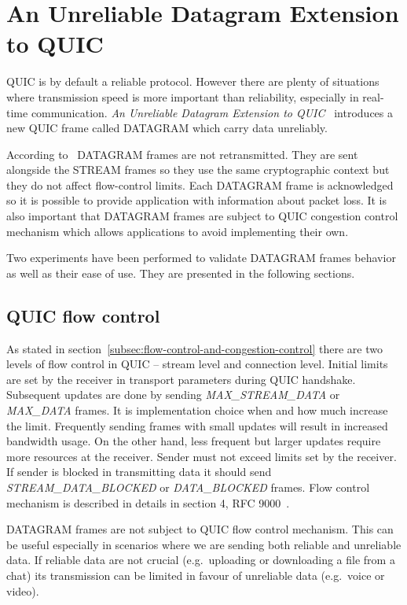 \section{An Unreliable Datagram Extension to QUIC}
\label{sec:datagrams}
QUIC is by default a reliable protocol.
However there are plenty of situations where transmission speed is more important than reliability, especially in real-time communication.
\textit{An Unreliable Datagram Extension to QUIC}~\cite{ietf-quic-datagram-02} introduces a new QUIC frame called DATAGRAM which carry data unreliably.

According to~\cite{ietf-quic-datagram-02} DATAGRAM frames are not retransmitted.
They are sent alongside the STREAM frames so they use the same cryptographic context but they do not affect flow-control limits.
Each DATAGRAM frame is acknowledged so it is possible to provide application with information about packet loss.
It is also important that DATAGRAM frames are subject to QUIC congestion control mechanism which allows applications to avoid implementing their own.

Two experiments have been performed to validate DATAGRAM frames behavior as well as their ease of use.
They are presented in the following sections.

\subsection{QUIC flow control}
\label{subsec:quic-flow-control}
As stated in section~\ref{subsec:flow-control-and-congestion-control} there are two levels of flow control in QUIC -- stream level and connection level.
Initial limits are set by the receiver in transport parameters during QUIC handshake.
Subsequent updates are done by sending \textit{MAX\_STREAM\_DATA} or \textit{MAX\_DATA} frames.
It is implementation choice when and how much increase the limit.
Frequently sending frames with small updates will result in increased bandwidth usage.
On the other hand, less frequent but larger updates require more resources at the receiver.
Sender must not exceed limits set by the receiver.
If sender is blocked in transmitting data it should send \textit{STREAM\_DATA\_BLOCKED} or \textit{DATA\_BLOCKED} frames.
Flow control mechanism is described in details in section 4, RFC 9000~\cite{rfc9000}.

DATAGRAM frames are not subject to QUIC flow control mechanism.
This can be useful especially in scenarios where we are sending both reliable and unreliable data.
If reliable data are not crucial (e.g.\ uploading or downloading a file from a chat) its transmission can be limited in favour of unreliable data (e.g.\ voice or video).

